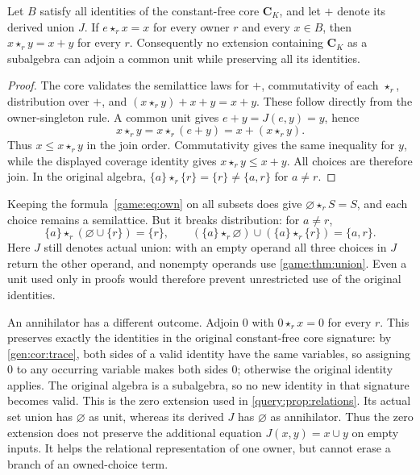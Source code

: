 \begin{proposition}\label{context:prop:common-unit}
Let $B$ satisfy all identities of the constant-free core $\mathbf C_K$,
and let $+$ denote its derived union $J$. If $e\star_r x=x$ for every
owner $r$ and every $x\in B$, then $x\star_r y=x+y$ for every $r$.
Consequently no extension containing $\mathbf C_K$ as a subalgebra can
adjoin a common unit while preserving all its identities.
\end{proposition}
\begin{proof}
The core validates the semilattice laws for $+$, commutativity of each
$\star_r$, distribution over $+$, and
$(x\star_r y)+x+y=x+y$. These follow directly from the owner-singleton
rule. A common unit gives $e+y=J(e,y)=y$, hence
\[
 x\star_r y=x\star_r(e+y)=x+(x\star_r y).
\]
Thus $x\leq x\star_r y$ in the join order. Commutativity gives the
same inequality for $y$, while the displayed coverage identity gives
$x\star_r y\leq x+y$. All choices are therefore join. In the original
algebra, $\{a\}\star_r\{r\}=\{r\}\ne\{a,r\}$ for $a\ne r$.
\end{proof}

Keeping the formula~\eqref{game:eq:own} on all subsets does give
$\varnothing\star_r S=S$, and each choice remains a semilattice.
But it breaks distribution: for $a\ne r$,
\[
 \{a\}\star_r(\varnothing\cup\{r\})=\{r\},\qquad
 (\{a\}\star_r\varnothing)\cup(\{a\}\star_r\{r\})=\{a,r\}.
\]
Here $J$ still denotes actual union: with an empty operand all three
choices in $J$ return the other operand, and nonempty operands use
\cref{game:thm:union}. Even a unit used only in proofs would therefore
prevent unrestricted use of the original identities.

An annihilator has a different outcome.
Adjoin $0$ with $0\star_r x=0$ for every $r$. This preserves exactly
the identities in the original constant-free core signature: by
\cref{gen:cor:trace}, both sides of a valid identity have the same
variables, so assigning $0$ to any occurring variable makes both sides
$0$; otherwise the original identity applies. The original algebra is
a subalgebra, so no new identity in that signature becomes valid.
This is the zero extension used in \cref{query:prop:relations}.
Its actual set union has $\varnothing$ as unit, whereas its derived
$J$ has $\varnothing$ as annihilator. Thus the zero extension does not
preserve the additional equation $J(x,y)=x\cup y$ on empty inputs.
It helps the relational representation of one owner, but cannot erase
a branch of an owned-choice term.

